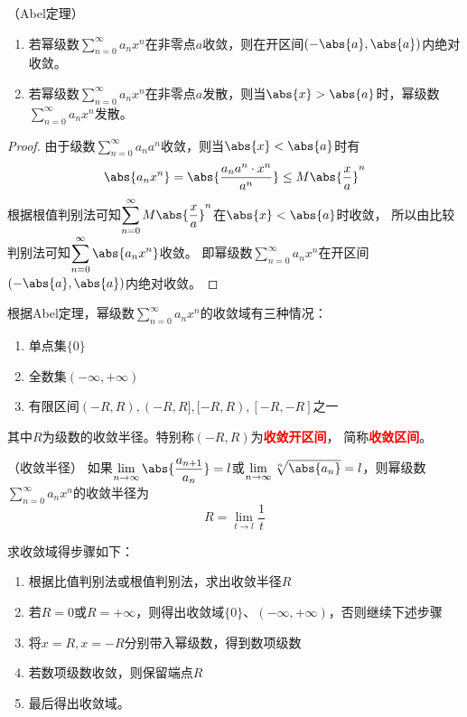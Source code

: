 \begin{theorem}
    （Abel定理）
    \label{th:Abel定理}
    \begin{enumerate}[(1)]
        \item 若幂级数$\displaystyle\sum_{n=0}^\infty a_nx^n$在非零点$a$收敛，则在开区间$(-\abs{a},\abs{a})$内绝对收敛。
        \item 若幂级数$\displaystyle\sum_{n=0}^\infty a_nx^n$在非零点$a$发散，则当$\abs{x} > \abs{a}$时，幂级数$\displaystyle\sum_{n=0}^\infty a_nx^n$发散。
    \end{enumerate}
\end{theorem}
\begin{proof}
    由于级数$\displaystyle\sum_{n=0}^\infty a_na^n$收敛，则当$\abs{x} < \abs{a}$时有
    \[ \abs{a_nx^n} = \abs{\frac{a_na^n \cdot x^n}{a^n}} \leq M\abs{\frac{x}{a}}^n  \]
    根据根值判别法可知$\displaystyle\sum_{n=0}^\infty M\abs{\frac{x}{a}}^n$在$\abs{x} < \abs{a}$时收敛，
    所以由比较判别法可知$\displaystyle\sum_{n=0}^\infty \abs{a_nx^n}$收敛。
    即幂级数$\displaystyle\sum_{n=0}^\infty a_nx^n$在开区间$(-\abs{a},\abs{a})$内绝对收敛。
\end{proof}
根据Abel定理，幂级数$\displaystyle\sum_{n=0}^\infty a_nx^n$的收敛域有三种情况：
\begin{enumerate}
    \item 单点集$\{0\}$
    \item 全数集$(-\infty,+\infty)$
    \item 有限区间$(-R,R), (-R,R], [-R,R), [-R,-R]$之一
\end{enumerate}
其中$R$为级数的收敛半径。特别称$(-R,R)$为\textcolor{red}{\textbf{\textsf{收敛开区间}}}，
简称\textcolor{red}{\textbf{\textsf{收敛区间}}}。

\begin{theorem}
    （收敛半径）
    如果$\displaystyle\lim_{n\to\infty}\abs{\frac{a_{n+1}}{a_n}} = l$或$\displaystyle\lim_{n\to\infty}\sqrt[n]{\abs{a_n}}=l$，则幂级数
    $\displaystyle\sum_{n=0}^\infty a_nx^n$的收敛半径为
    \[ R = \lim_{t \to l} \frac{1}{t} \]
\end{theorem}

求收敛域得步骤如下：
\begin{enumerate}[(1)]
    \item 根据比值判别法或根值判别法，求出收敛半径$R$
    \item 若$R=0$或$R=+\infty$，则得出收敛域$\{0\}$、$(-\infty,+\infty)$，否则继续下述步骤
    \item 将$x=R,x=-R$分别带入幂级数，得到数项级数
    \item 若数项级数收敛，则保留端点$R$
    \item 最后得出收敛域。
\end{enumerate}


